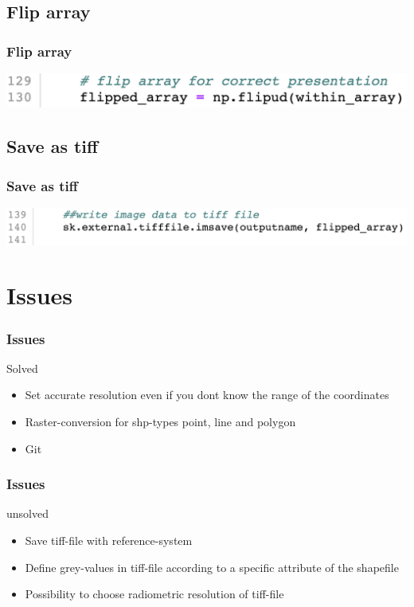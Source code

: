 \documentclass[12pt]{beamer}
\begin{document}
\subsection{Flip array}
\begin{frame}\frametitle{Flip array}
\hspace{0cm} 
\includegraphics[scale=0.3]{flip.png}
\end{frame}

\subsection{Save as tiff}
\begin{frame}\frametitle{Save as tiff}
\includegraphics[scale=0.3]{tiffsave.png}
\end{frame}

\section{Issues}
\begin{frame}\frametitle{Issues}
\begin{block}{Solved}
\begin{itemize}
\item Set accurate resolution even if you dont know the range of the coordinates
\item Raster-conversion for shp-types point, line and polygon
\item Git
\end{itemize}
\end{block}
\end{frame}


\begin{frame}\frametitle{Issues}
\begin{block}{unsolved}
\begin{itemize}
\item Save tiff-file with reference-system
\item Define grey-values in tiff-file according to a specific attribute of the shapefile
\item Possibility to choose radiometric resolution of tiff-file 
\end{itemize}
\end{block}
\end{frame}
\end{document}
